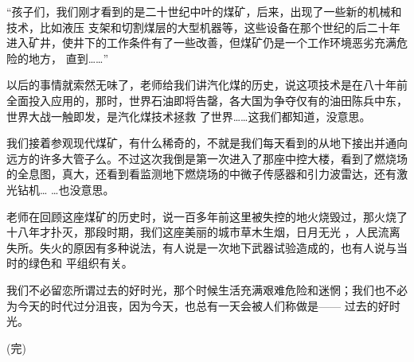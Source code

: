 \documentclass{article}
\begin{document}
“孩子们，我们刚才看到的是二十世纪中叶的煤矿，后来，出现了一些新的机械和技术，比如液压
\newpage
支架和切割煤层的大型机器等，这些设备在那个世纪的后二十年进入矿井，使井下的工作条件有了一些改善，但煤矿仍是一个工作环境恶劣充满危险的地方，
直到……” 

以后的事情就索然无味了，老师给我们讲汽化煤的历史，说这项技术是在八十年前全面投入应用的，那时，世界石油即将告罄，各大国为争夺仅有的油田陈兵中东，世界大战一触即发，是汽化煤技术拯救
了世界……这我们都知道，没意思。 

我们接着参观现代煤矿，有什么稀奇的，不就是我们每天看到的从地下接出并通向远方的许多大管子么。不过这次我倒是第一次进入了那座中控大楼，看到了燃烧场的全息图，真大，还看到看监测地下燃烧场的中微子传感器和引力波雷达，还有激光钻机…
…也没意思。 

老师在回顾这座煤矿的历史时，说一百多年前这里被失控的地火烧毁过，那火烧了十八年才扑灭，那段时期，我们这座美丽的城市草木生烟，日月无光
\newpage
，人民流离失所。失火的原因有多种说法，有人说是一次地下武器试验造成的，也有人说与当时的绿色和
平组织有关。 

我们不必留恋所谓过去的好时光，那个时候生活充满艰难危险和迷惘；我们也不必为今天的时代过分沮丧，因为今天，也总有一天会被人们称做是——
过去的好时光。 



(完) 
\end{document}
